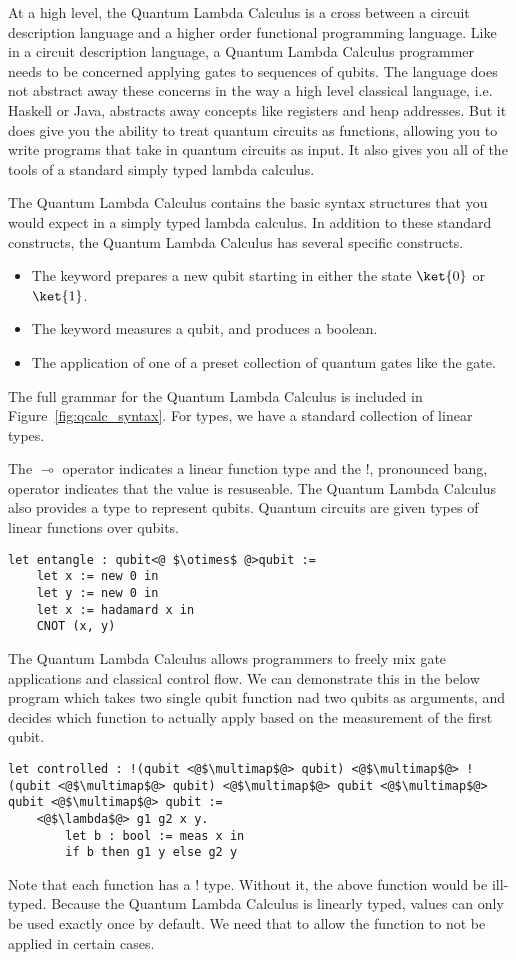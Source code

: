At a high level, the Quantum Lambda Calculus is a cross between a circuit description language and a higher order functional programming language.
Like in a circuit description language, a Quantum Lambda Calculus programmer needs to be concerned applying gates to sequences of qubits.
The language does not abstract away these concerns in the way a high level classical language, i.e. Haskell or Java, abstracts away concepts like registers and heap addresses.
But it does give you the ability to treat quantum circuits as functions, allowing you to write programs that take in quantum circuits as input.
It also gives you all of the tools of a standard simply typed lambda calculus.

The Quantum Lambda Calculus contains the basic syntax structures that you would expect in a simply typed lambda calculus.
In addition to these standard constructs, the Quantum Lambda Calculus has several specific constructs.
\begin{itemize}
\item The  keyword prepares a new qubit starting in either the state $\ket{0}$ or $\ket{1}$.
\item The  keyword measures a qubit, and produces a boolean.
\item The application of one of a preset collection of quantum gates like the  gate.
\end{itemize}
The full grammar for the Quantum Lambda Calculus is included in Figure~\ref{fig:qcalc_syntax}.
For types, we have a standard collection of linear types.


The $\multimap$ operator indicates a linear function type and the $!$, pronounced bang, operator indicates that the value is resuseable.
The Quantum Lambda Calculus also provides a  type to represent qubits.
Quantum circuits are given types of linear functions over qubits.

\begin{lstlisting}[style=customcoq]
let entangle : qubit<@ $\otimes$ @>qubit :=
    let x := new 0 in
    let y := new 0 in
    let x := hadamard x in
    CNOT (x, y)
\end{lstlisting}

The Quantum Lambda Calculus allows programmers to freely mix gate applications and classical control flow.
We can demonstrate this in the below program which takes two single qubit function nad two qubits as arguments, and decides which function to actually apply based on the measurement of the first qubit.
\begin{lstlisting}[style=customcoq]
let controlled : !(qubit <@$\multimap$@> qubit) <@$\multimap$@> !(qubit <@$\multimap$@> qubit) <@$\multimap$@> qubit <@$\multimap$@> qubit <@$\multimap$@> qubit :=
    <@$\lambda$@> g1 g2 x y.
        let b : bool := meas x in
        if b then g1 y else g2 y
\end{lstlisting}
Note that each function has a $!$ type.
Without it, the above function would be ill-typed.
Because the Quantum Lambda Calculus is linearly typed, values can only be used exactly once by default.
We need that to allow the function to not be applied in certain cases.

